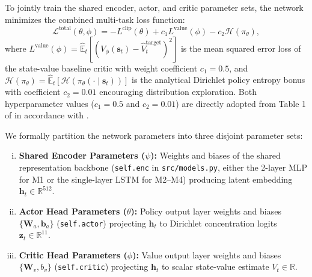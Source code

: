 To jointly train the shared encoder, actor, and critic parameter sets, the network minimizes the combined multi-task loss function:
\begin{equation}
\mathcal{L}^{\text{total}}(\theta, \phi) = - L^{\text{clip}}(\theta) + c_1 L^{\text{value}}(\phi) - c_2 \mathcal{H}(\pi_\theta),
\label{eq:total_loss}
\end{equation}
where $L^{\text{value}}(\phi) = \hat{\mathbb{E}}_t \left[ (V_\phi(\mathbf{s}_t) - \hat{V}_t^{\text{target}})^2 \right]$ is the mean squared error loss of the state-value baseline critic with weight coefficient $c_1 = 0.5$, and $\mathcal{H}(\pi_\theta) = \hat{\mathbb{E}}_t \left[ \mathcal{H}(\pi_\theta(\cdot \mid \mathbf{s}_t)) \right]$ is the analytical Dirichlet policy entropy bonus with coefficient $c_2 = 0.01$ encouraging distribution exploration. Both hyperparameter values ($c_1 = 0.5$ and $c_2 = 0.01$) are directly adopted from Table 1 of \citet{zou2024novel} in accordance with \citet{schulman2017proximal}.

We formally partition the network parameters into three disjoint parameter sets:
\begin{enumerate}[(i)]
    \setlength{\itemsep}{1pt}\setlength{\parskip}{0pt}
    \item \textbf{Shared Encoder Parameters ($\psi$):} Weights and biases of the shared representation backbone (\texttt{self.enc} in \texttt{src/models.py}, either the 2-layer MLP for M1 or the single-layer LSTM for M2--M4) producing latent embedding $\mathbf{h}_t \in \mathbb{R}^{512}$.
    \item \textbf{Actor Head Parameters ($\theta$):} Policy output layer weights and biases $\{\mathbf{W}_a, \mathbf{b}_a\}$ (\texttt{self.actor}) projecting $\mathbf{h}_t$ to Dirichlet concentration logits $\mathbf{z}_t \in \mathbb{R}^{11}$.
    \item \textbf{Critic Head Parameters ($\phi$):} Value output layer weights and biases $\{\mathbf{W}_v, b_v\}$ (\texttt{self.critic}) projecting $\mathbf{h}_t$ to scalar state-value estimate $V_t \in \mathbb{R}$.
\end{enumerate}

